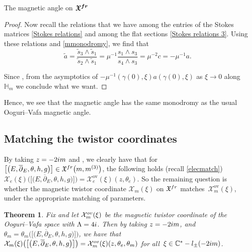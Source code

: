 \documentclass[11pt]{article}
\numberwithin{equation}{section}
\newtheorem{Theorem}{Theorem}[section]
\numberwithin{equation}{section}
\newcommand{\MC}{\mathcal{X}_m}
\newcommand{\MCOV}{\mathcal{X}_m^{\text{ov}}}
\begin{document}
\begin{subsubsection}{The magnetic angle on $\boldsymbol{\mathfrak{X}^{{\rm fr}}}$}
\begin{proof}
Now recall the relations that we have among the entries of the Stokes matrices \eqref{Stokes relations} and among the flat sections \eqref{Stokes relations 3}. Using these relations and \eqref{mmonodromy}, we find that
\begin{equation*}
 \widetilde{a}=\frac{\widetilde{s}_3\wedge \widetilde{s}_1}{\widetilde{s}_2\wedge \widetilde{s}_1}= \mu^{-1}\frac{ s_1 \wedge s_3}{s_4\wedge s_3}=\mu^{-2}c=-\mu^{-1} a.
\end{equation*}

Since , from the asymptotics of $-\mu^{-1}(\gamma(0),\xi)a(\gamma(0),\xi)$ as $\xi \to 0$ along $\mathbb{H}_m$ we conclude what we want.
\end{proof}

Hence, we see that the magnetic angle has the same monodromy as the usual Ooguri--Vafa magnetic angle.

\end{subsubsection}


\subsection{Matching the twistor coordinates}\label{OVT}
By taking $z= -2{\rm i}m$ and , we clearly have that for $\bigl[\bigl(E,\overline{\partial}_E,\theta,h,g\bigr)\bigr]\in \mathfrak{X}^{{\rm fr}}\bigl(m,m^{(3)}\bigr)$, the following holds (recall \eqref{elecmatch})
$\mathcal{X}_e(\xi)\bigl(\bigl[\bigl(E,\overline{\partial}_E,\theta,h,g\bigr)\bigr]\bigr)=\mathcal{X}_e^{\text{ov}}(\xi)(z,\theta_e)$.
So the remaining question is whether the magnetic twistor coordinate $\MC(\xi)$ on $\mathfrak{X}^{{\rm fr}}$ match\-es~$\MCOV(\xi)$, under the appropriate matching of parameters.

\begin{Theorem} \label{matchingTC} Fix  and let $\MC^{\textnormal{ov}}(\xi)$ be the magnetic twistor coordinate of the Ooguri--Vafa space with $\Lambda=4{\rm i}$. Then by taking $z=-2{\rm i}m$,  and $\theta_m=\theta_m\bigl(\bigl[\bigl(E,\overline{\partial}_E,\theta,h,g\bigr)\bigr]\bigr)$, we have that $\MC(\xi)\bigl(\bigl[\bigl(E,\overline{\partial}_E,\theta,h,g\bigr)\bigr]\bigr)= \MC^{\textnormal{ov}}(\xi)(z,\theta_e,\theta_m)$ for all~${\xi \in \mathbb{C}^* - l_{\pm}(-2{\rm i}m)}$.
\end{Theorem}
\end{document}
